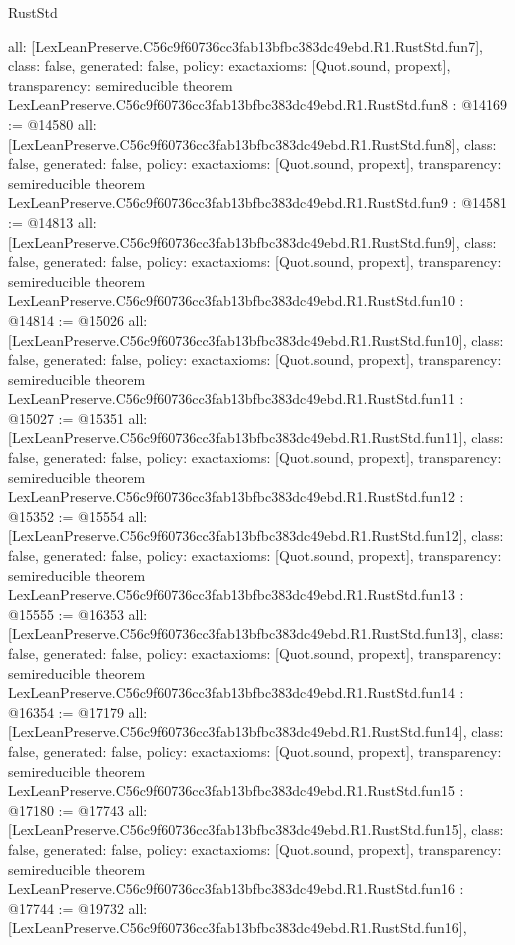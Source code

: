\begin{lexlean}{RustStd}
\begin{coremodule}
{  all: [LexLeanPreserve.C56c9f60736cc3fab13bfbc383dc49ebd.R1.RustStd.fun7],
  class: false,
  generated: false,
  policy: exact{axioms: [Quot.sound, propext]},
  transparency: semireducible
}
theorem LexLeanPreserve.C56c9f60736cc3fab13bfbc383dc49ebd.R1.RustStd.fun8 : @14169 := @14580 {
  all: [LexLeanPreserve.C56c9f60736cc3fab13bfbc383dc49ebd.R1.RustStd.fun8],
  class: false,
  generated: false,
  policy: exact{axioms: [Quot.sound, propext]},
  transparency: semireducible
}
theorem LexLeanPreserve.C56c9f60736cc3fab13bfbc383dc49ebd.R1.RustStd.fun9 : @14581 := @14813 {
  all: [LexLeanPreserve.C56c9f60736cc3fab13bfbc383dc49ebd.R1.RustStd.fun9],
  class: false,
  generated: false,
  policy: exact{axioms: [Quot.sound, propext]},
  transparency: semireducible
}
theorem LexLeanPreserve.C56c9f60736cc3fab13bfbc383dc49ebd.R1.RustStd.fun10 : @14814 := @15026 {
  all: [LexLeanPreserve.C56c9f60736cc3fab13bfbc383dc49ebd.R1.RustStd.fun10],
  class: false,
  generated: false,
  policy: exact{axioms: [Quot.sound, propext]},
  transparency: semireducible
}
theorem LexLeanPreserve.C56c9f60736cc3fab13bfbc383dc49ebd.R1.RustStd.fun11 : @15027 := @15351 {
  all: [LexLeanPreserve.C56c9f60736cc3fab13bfbc383dc49ebd.R1.RustStd.fun11],
  class: false,
  generated: false,
  policy: exact{axioms: [Quot.sound, propext]},
  transparency: semireducible
}
theorem LexLeanPreserve.C56c9f60736cc3fab13bfbc383dc49ebd.R1.RustStd.fun12 : @15352 := @15554 {
  all: [LexLeanPreserve.C56c9f60736cc3fab13bfbc383dc49ebd.R1.RustStd.fun12],
  class: false,
  generated: false,
  policy: exact{axioms: [Quot.sound, propext]},
  transparency: semireducible
}
theorem LexLeanPreserve.C56c9f60736cc3fab13bfbc383dc49ebd.R1.RustStd.fun13 : @15555 := @16353 {
  all: [LexLeanPreserve.C56c9f60736cc3fab13bfbc383dc49ebd.R1.RustStd.fun13],
  class: false,
  generated: false,
  policy: exact{axioms: [Quot.sound, propext]},
  transparency: semireducible
}
theorem LexLeanPreserve.C56c9f60736cc3fab13bfbc383dc49ebd.R1.RustStd.fun14 : @16354 := @17179 {
  all: [LexLeanPreserve.C56c9f60736cc3fab13bfbc383dc49ebd.R1.RustStd.fun14],
  class: false,
  generated: false,
  policy: exact{axioms: [Quot.sound, propext]},
  transparency: semireducible
}
theorem LexLeanPreserve.C56c9f60736cc3fab13bfbc383dc49ebd.R1.RustStd.fun15 : @17180 := @17743 {
  all: [LexLeanPreserve.C56c9f60736cc3fab13bfbc383dc49ebd.R1.RustStd.fun15],
  class: false,
  generated: false,
  policy: exact{axioms: [Quot.sound, propext]},
  transparency: semireducible
}
theorem LexLeanPreserve.C56c9f60736cc3fab13bfbc383dc49ebd.R1.RustStd.fun16 : @17744 := @19732 {
  all: [LexLeanPreserve.C56c9f60736cc3fab13bfbc383dc49ebd.R1.RustStd.fun16],
}
\end{coremodule}
\end{lexlean}
